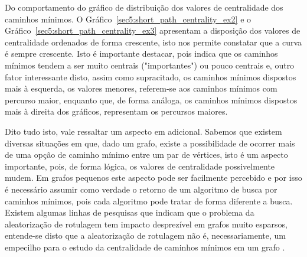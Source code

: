 Do comportamento do gráfico de distribuição dos valores de centralidade dos caminhos mínimos. O Gráfico~\ref{sec5:short_path_centrality_ex2} e o Gráfico~\ref{sec5:short_path_centrality_ex3} apresentam a disposição dos valores de centralidade ordenados de forma crescente, isto nos permite constatar que a curva é sempre crescente. Isto é importante destacar, pois indica que os caminhos mínimos tendem a ser muito centrais ("importantes") ou pouco centrais e, outro fator interessante disto, assim como supracitado, os caminhos mínimos dispostos mais à esquerda, os valores menores, referem-se aos caminhos mínimos com percurso maior, enquanto que, de forma análoga, os caminhos mínimos dispostos mais à direita dos gráficos, representam os percursos maiores.

Dito tudo isto, vale ressaltar um aspecto em adicional. Sabemos que existem diversas situações em que, dado um grafo, existe a possibilidade de ocorrer mais de uma opção de caminho mínimo entre um par de vértices, isto é um aspecto importante, pois, de forma lógica, os valores de centralidade possivelmente mudem. Em grafos pequenos este aspecto pode ser facilmente percebido e por isso é necessário assumir como verdade o retorno de um algoritmo de busca por caminhos mínimos, pois cada algoritmo pode tratar de forma diferente a busca. Existem algumas linhas de pesquisas que indicam que o problema da aleatorização de rotulagem tem impacto desprezível em grafos muito esparsos, entende-se disto que a aleatorização de rotulagem não é, necessariamente, um empecilho para o estudo da centralidade de caminhos mínimos em um grafo \cite{alane2021}.

